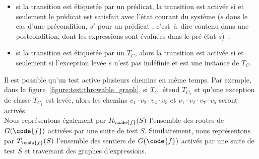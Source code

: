 \begin{itemize}
\item si la transition est étiquetée par un prédicat, la transition est activée
si et seulement le prédicat est satisfait avec l'état courant du système ($s$
dans le cas d'une précondition, $s'$ pour un prédicat ,
c'est~à~dire contenu dans une postcondition, dont les expressions \aold{\empty}
sont évaluées dans le pré-état $s$)~;

\item si la transition est étiquetée par un  $T_C$,
alors la transition est activée si et seulement si l'exception levée $e$ n'est
pas indéfinie et est une instance de $T_C$.

\end{itemize}

Il est possible qu'un test active plusieurs chemins en même temps. Par exemple,
dans la figure~\ref{figure:test:throwable_graph}, si $T_{C_1}$ étend $T_{C_2}$
et qu'une exception de classe $T_{C_1}$ est levée, alors les chemins $v_1 \cdot
v_2 \cdot v_4 \cdot v_5$ et $v_1 \cdot v_2 \cdot v_7 \cdot v_5$ seront activés.
\\

Nous représentons également par $R_\code{f}(S)$ l'ensemble des routes de
$G(\code{f})$ activées par une suite de test $S$. Similairement, nous
représentons par $T_\code{f}(S)$ l'ensemble des sentiers de $G(\code{f})$
activés par une suite de test $S$ et traversant des graphes d'expressions.
